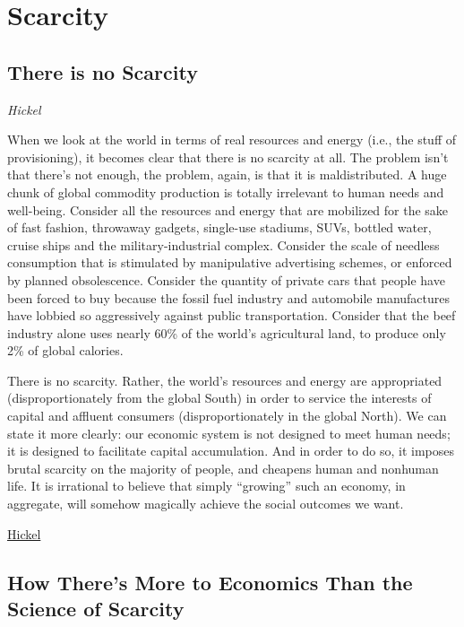 \documentclass[
]{book}
\begin{document}
\hypertarget{scarcity}{%
\chapter{Scarcity}\label{scarcity}}

\hypertarget{there-is-no-scarcity}{%
\section{There is no Scarcity}\label{there-is-no-scarcity}}

\emph{Hickel}

When we look at the world in terms of real resources and energy (i.e., the stuff of provisioning), it becomes clear that there is no scarcity at all. The problem isn't that there's not enough, the problem, again, is that it is maldistributed. A huge chunk of global commodity production is totally irrelevant to human needs and well-being. Consider all the resources and energy that are mobilized for the sake of fast fashion, throwaway gadgets, single-use stadiums, SUVs, bottled water, cruise ships and the military-industrial complex. Consider the scale of needless consumption that is stimulated by manipulative advertising schemes, or enforced by planned obsolescence. Consider the quantity of private cars that people have been forced to buy because the fossil fuel industry and automobile manufactures have lobbied so aggressively against public transportation. Consider that the beef industry alone uses nearly 60\% of the world's agricultural land, to produce only 2\% of global calories.

There is no scarcity. Rather, the world's resources and energy are appropriated (disproportionately from the global South) in order to service the interests of capital and affluent consumers (disproportionately in the global North). We can state it more clearly: our economic system is not designed to meet human needs; it is designed to facilitate capital accumulation. And in order to do so, it imposes brutal scarcity on the majority of people, and cheapens human and nonhuman life. It is irrational to believe that simply ``growing'' such an economy, in aggregate, will somehow magically achieve the social outcomes we want.

\href{https://www.jasonhickel.org/blog/2021/2/21/is-the-world-poor-or-unjust}{Hickel}

\hypertarget{how-theres-more-to-economics-than-the-science-of-scarcity}{%
\section{How There's More to Economics Than the Science of Scarcity}\label{how-theres-more-to-economics-than-the-science-of-scarcity}}
\end{document}
